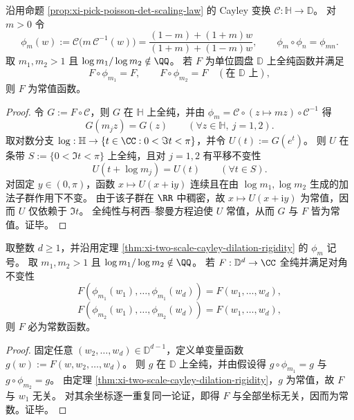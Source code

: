 \begin{theorem}\label{thm:xi-two-scale-cayley-dilation-rigidity}
沿用命题 \ref{prop:xi-pick-poisson-det-scaling-law} 的 Cayley 变换 \(\mathcal{C}:\mathbb{H}\to\mathbb{D}\)。
对 \(m>0\) 令
\[
\phi_m(w):=\mathcal{C}\!\bigl(m\,\mathcal{C}^{-1}(w)\bigr)
=\frac{(1-m)+(1+m)w}{(1+m)+(1-m)w},
\qquad
\phi_m\circ\phi_n=\phi_{mn}.
\]
取 \(m_1,m_2>1\) 且 \(\log m_1/\log m_2\notin\QQ\)。
若 \(F\) 为单位圆盘 \(\mathbb{D}\) 上全纯函数并满足
\[
F\circ\phi_{m_1}=F,
\qquad
F\circ\phi_{m_2}=F
\quad(\text{在 }\mathbb{D}\text{ 上}),
\]
则 \(F\) 为常值函数。
\end{theorem}
\begin{proof}
令 \(G:=F\circ\mathcal{C}\)，则 \(G\) 在 \(\mathbb{H}\) 上全纯，并由 \(\phi_m=\mathcal{C}\circ(z\mapsto mz)\circ\mathcal{C}^{-1}\) 得
\[
G(m_j z)=G(z)\qquad(\forall z\in\mathbb{H},\ j=1,2).
\]
取对数分支 \(\log:\mathbb{H}\to\{t\in\CC:0<\Im t<\pi\}\)，并令 \(U(t):=G(e^t)\)。
则 \(U\) 在条带 \(S:=\{0<\Im t<\pi\}\) 上全纯，且对 \(j=1,2\) 有平移不变性
\[
U(t+\log m_j)=U(t)\qquad(\forall t\in S).
\]
对固定 \(y\in(0,\pi)\)，函数 \(x\mapsto U(x+\mathrm{i}y)\) 连续且在由 \(\log m_1,\log m_2\) 生成的加法子群作用下不变。
由于该子群在 \(\RR\) 中稠密，故 \(x\mapsto U(x+\mathrm{i}y)\) 为常值，因而 \(U\) 仅依赖于 \(\Im t\)。
全纯性与柯西--黎曼方程迫使 \(U\) 常值，从而 \(G\) 与 \(F\) 皆为常值。证毕。
\end{proof}

\begin{corollary}\label{cor:xi-multivariable-two-scale-cayley-rigidity}
取整数 \(d\ge 1\)，并沿用定理 \ref{thm:xi-two-scale-cayley-dilation-rigidity} 的 \(\phi_m\) 记号。
取 \(m_1,m_2>1\) 且 \(\log m_1/\log m_2\notin\QQ\)。
若 \(F:\mathbb{D}^{d}\to\CC\) 全纯并满足对角不变性
\[
F(\phi_{m_1}(w_1),\dots,\phi_{m_1}(w_d))=F(w_1,\dots,w_d),
\]
\[
F(\phi_{m_2}(w_1),\dots,\phi_{m_2}(w_d))=F(w_1,\dots,w_d),
\]
则 \(F\) 必为常数函数。
\end{corollary}
\begin{proof}
固定任意 \((w_2,\dots,w_d)\in\mathbb{D}^{d-1}\)，定义单变量函数 \(g(w):=F(w,w_2,\dots,w_d)\)。
则 \(g\) 在 \(\mathbb{D}\) 上全纯，并由假设得 \(g\circ\phi_{m_1}=g\) 与 \(g\circ\phi_{m_2}=g\)。
由定理 \ref{thm:xi-two-scale-cayley-dilation-rigidity}，\(g\) 为常值，故 \(F\) 与 \(w_1\) 无关。
对其余坐标逐一重复同一论证，即得 \(F\) 与全部坐标无关，因而为常数。证毕。
\end{proof}

